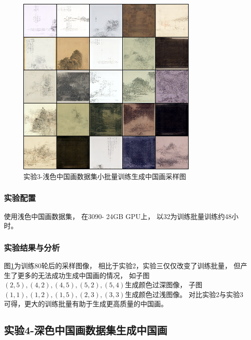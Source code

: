 \begin{figure}[H]
    \centering
    \includegraphics[width=0.8\textwidth]{figures/diffusion/results3/sample-80.png}
    \caption{实验3-浅色中国画数据集小批量训练生成中国画采样图}\label{fig:diffusion_results3_sample80}
\end{figure}

\subsubsection{实验配置}
使用浅色中国画数据集，
在3090- 24GB GPU上，
以32为训练批量训练约48小时。
\subsubsection{实验结果与分析}
图{\ref{fig:diffusion_results3_sample80}}为训练80轮后的采样图像，
相比于实验2，实验三仅仅改变了训练批量，
但产生了更多的无法成功生成中国画的情况，
如子图{$(2,5),(4,2),(4,5),(5,2),(5,4)$}生成颜色过深图像，
子图{$(1,1),(1,2),(1,5),(2,3),(3,3)$}生成颜色过浅图像。
对比实验2与实验3可得，更大的训练批量有助于生成更高质量的中国画。





\subsection{实验4-深色中国画数据集生成中国画}

